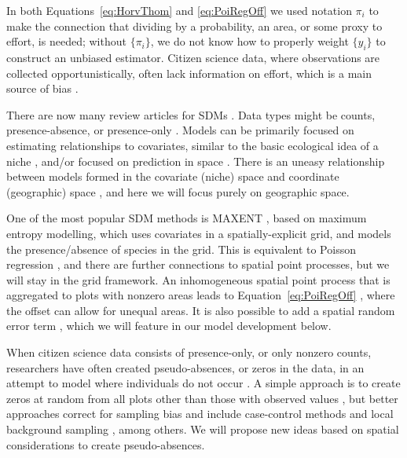 \documentclass[11pt, titlepage]{article}
\begin{document}
\begin{spacing}{1.9}
\begin{flushleft}
In both Equations~\eqref{eq:HorvThom} and \eqref{eq:PoiRegOff} we used notation $\pi_{i}$ to make the connection that dividing by a probability, an area, or some proxy to effort, is needed; without $\{\pi_i\}$, we do not know how to properly weight $\{y_i\}$ to construct an unbiased estimator. Citizen science data, where observations are collected opportunistically, often lack information on effort, which is a main source of bias \citep{bird_statistical_2014}.

There are now many review articles for SDMs \citep[e.g.,][]{austin_species_2007,
elith_species_2009, hefley_hierarchical_2016,
robinson_systematic_2017, araujo_standards_2019}. Data types might be counts, presence-absence, or presence-only \citep{hefley_hierarchical_2016}. Models can be primarily focused on estimating relationships to covariates, similar to the basic ecological idea of a niche \citep{soberon_grinnellian_2007,elith_species_2009}, and/or focused on prediction in space \citep{austin_spatial_2002,elith_species_2009}.  There is an uneasy relationship between models formed in the covariate (niche) space and coordinate (geographic) space \citep{randin_are_2006}, and here we will focus purely on geographic space.

One of the most popular SDM methods is MAXENT \citep{phillips_maximum_2006}, based on maximum entropy modelling, which uses covariates in a spatially-explicit grid, and models the presence/absence of species in the grid. This is equivalent to Poisson regression \citep{renner_equivalence_2013}, and there are further connections to spatial point processes, but we will stay in the grid framework. An inhomogeneous spatial point process that is aggregated to plots with nonzero areas leads to Equation~\ref{eq:PoiRegOff} \citep{warton_poisson_2010}, where the offset can allow for unequal areas.  It is also possible to add a spatial random error term \citep{guelat_effects_2018}, which we will feature in our model development below.

When citizen science data consists of presence-only, or only nonzero counts, researchers have often created pseudo-absences, or zeros in the data, in an attempt to model where individuals do not occur \citep{pearce_modelling_2006, conn_extrapolating_2015}. A simple approach is to create zeros at random from all plots other than those with observed values \citep{stockwell_controlling_2002}, but better approaches correct for sampling bias \citep{phillips_sample_2009, conn_confronting_2017} and include case-control methods \citep{fithian_local_2014} and local background sampling \citep{daniel_efficient_2020}, among others. We will propose new ideas based on spatial considerations to create pseudo-absences.


\end{flushleft}
\end{spacing}
\end{document}
